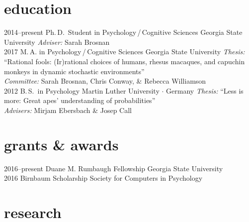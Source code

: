 \documentclass[]{friggeri-cv}
\begin{document}
\section{education}

\begin{entrylist}
  \entry
    {2014--present}
    {Ph.\,D.~Student in Psychology\,/\,Cognitive Sciences}
    {Georgia State University}
    {\emph{Adviser:} Sarah Brosnan\\[-.3cm]}
 \entry
   {2017}
   {M.\,A. in Psychology\,/\,Cognitive Sciences}
   {Georgia State University}
   {\emph{Thesis:} ``Rational fools: (Ir)rational choices of humans, rhesus macaques, and capuchin monkeys in dynamic stochastic environments''\\
   \emph{Committee:} Sarah Brosnan, Chris Conway, \& Rebecca Williamson\\[-.3cm]}
  \entry
    {2012}
    {B.\,S.~in Psychology}
    {Martin Luther University $\cdot$ Germany}
    {\emph{Thesis:} ``Less is more: Great apes' understanding of probabilities''\\
    \emph{Advisers:} Mirjam Ebersbach \& Josep Call}
\end{entrylist}


\section{grants \& awards}

\begin{entrylist}
  \entry
    {2016--present}
    {Duane M. Rumbaugh Fellowship}
    {Georgia State University}
    {\\[-.7cm]}
  \entry
    {2016}
    {Birnbaum Scholarship}
    {Society for Computers in Psychology}
    {}
\end{entrylist}

\section{research}
\end{document}
